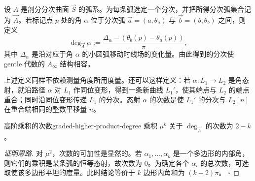 设 $A$ 是剖分分次曲面 $\vec S$ 的弧系。为每条弧选定一个分次，并把所得分次弧集合记为 $\vec A$。若标记点 $p$ 处的角 $\alpha$ 位于分次弧 $\vec a=(a,\theta_a)$ 与 $\vec b=(b,\theta_b)$ 之间，则定义
\[
  \deg_{\vec A}\alpha
  :=\frac{\Delta_\alpha-(\theta_b(p)-\theta_a(p))}{\pi},
\]
其中 $\Delta_\alpha$ 是沿对应于角 $\alpha$ 的小圆弧移动时线场的变化量。由此得到的分次使 gentle 代数的 $A_\infty$ 结构相容。

\begin{note}[角态射的分次]
上述定义同样不依赖测量角度所用度量。还可以这样定义：若 $\alpha\colon L_1\to L_2$ 是角态射，就沿路径 $\alpha$ 对 $L_1$ 作同位变形，得到一条新曲线 $L_1'$，使其端点与 $L_2$ 的端点重合；同时沿同位变形传递 $L_1$ 的分次。态射 $\alpha$ 的次数是使 $L_1'$ 的分次与 $L_2[n]$ 在重合端相同的整数平移量 $n$。
\end{note}

\begin{lemma}{高阶乘积的次数}{graded-higher-product-degree}
乘积 $\mu^k$ 关于 $\deg_{\vec A}$ 的次数为 $2-k$。
\end{lemma}
\begin{proof}[证明思路]
对 $\mu^2$，次数的可加性是显然的。若 $\alpha_1,\ldots,\alpha_k$ 是一个多边形的内部角，则它们的乘积是某条弧的恒等态射，故次数为 $0$。为确定各个 $\alpha_i$ 的总次数，可选取使该多边形平坦的度量。此时结论等价于 $k$ 边形内角和为 $(k-2)\pi$。
\hfill$\square$
\end{proof}

